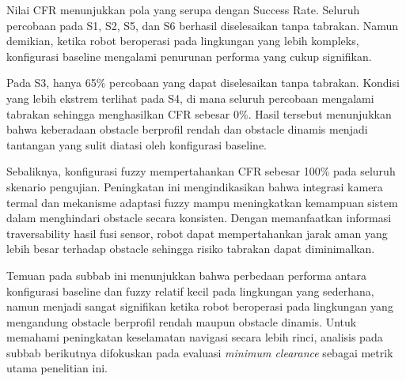 Nilai CFR menunjukkan pola yang serupa dengan Success Rate. Seluruh percobaan pada S1, S2, S5, dan S6 berhasil diselesaikan tanpa tabrakan. Namun demikian, ketika robot beroperasi pada lingkungan yang lebih kompleks, konfigurasi baseline mengalami penurunan performa yang cukup signifikan.

Pada S3, hanya 65\% percobaan yang dapat diselesaikan tanpa tabrakan. Kondisi yang lebih ekstrem terlihat pada S4, di mana seluruh percobaan mengalami tabrakan sehingga menghasilkan CFR sebesar 0\%. Hasil tersebut menunjukkan bahwa keberadaan obstacle berprofil rendah dan obstacle dinamis menjadi tantangan yang sulit diatasi oleh konfigurasi baseline.

Sebaliknya, konfigurasi fuzzy mempertahankan CFR sebesar 100\% pada seluruh skenario pengujian. Peningkatan ini mengindikasikan bahwa integrasi kamera termal dan mekanisme adaptasi fuzzy mampu meningkatkan kemampuan sistem dalam menghindari obstacle secara konsisten. Dengan memanfaatkan informasi traversability hasil fusi sensor, robot dapat mempertahankan jarak aman yang lebih besar terhadap obstacle sehingga risiko tabrakan dapat diminimalkan.

Temuan pada subbab ini menunjukkan bahwa perbedaan performa antara konfigurasi baseline dan fuzzy relatif kecil pada lingkungan yang sederhana, namun menjadi sangat signifikan ketika robot beroperasi pada lingkungan yang mengandung obstacle berprofil rendah maupun obstacle dinamis. Untuk memahami peningkatan keselamatan navigasi secara lebih rinci, analisis pada subbab berikutnya difokuskan pada evaluasi \textit{minimum clearance} sebagai metrik utama penelitian ini.
